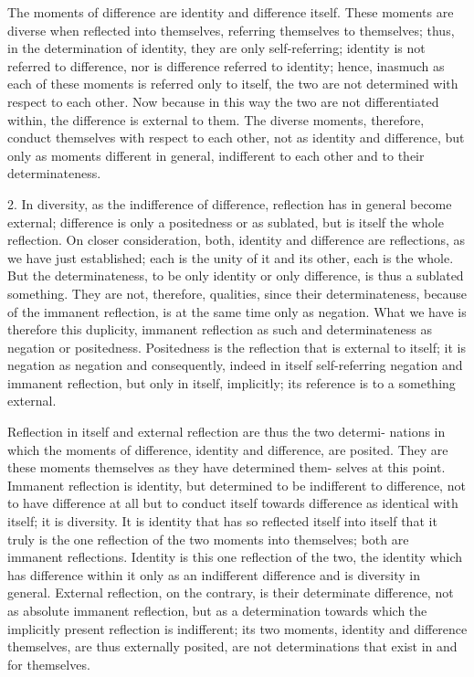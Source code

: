 The moments of difference are identity and difference itself. These
moments are diverse when reflected into themselves, referring themselves to
themselves; thus, in the determination of identity, they are only self-referring;
identity is not referred to difference, nor is difference referred to identity;
hence, inasmuch as each of these moments is referred only to itself, the two
are not determined with respect to each other.  Now because in this way
the two are not differentiated within, the difference is external to them. The
diverse moments, therefore, conduct themselves with respect to each other,
not as identity and difference, but only as moments different in general,
indifferent to each other and to their determinateness.

2. In diversity, as the indifference of difference, reflection has in general
become external; difference is only a positedness or as sublated, but is itself the
whole reflection.  On closer consideration, both, identity and difference
are reflections, as we have just established; each is the unity of it and
its other, each is the whole. But the determinateness, to be only identity
or only difference, is thus a sublated something. They are not, therefore,
qualities, since their determinateness, because of the immanent reflection,
is at the same time only as negation. What we have is therefore this
duplicity, immanent reflection as such and determinateness as negation or
positedness. Positedness is the reflection that is external to itself; it is negation
as negation and consequently, indeed in itself self-referring negation and
immanent reflection, but only in itself, implicitly; its reference is to a
something external.

Reflection in itself and external reflection are thus the two determi-
nations in which the moments of difference, identity and difference, are
posited. They are these moments themselves as they have determined them-
selves at this point.  Immanent reflection is identity, but determined to
be indifferent to difference, not to have difference at all but to conduct
itself towards difference as identical with itself; it is diversity. It is identity
that has so reflected itself into itself that it truly is the one reflection of
the two moments into themselves; both are immanent reflections. Identity
is this one reflection of the two, the identity which has difference within
it only as an indifferent difference and is diversity in general.  External
reflection, on the contrary, is their determinate difference, not as absolute
immanent reflection, but as a determination towards which the implicitly
present reflection is indifferent; its two moments, identity and difference
themselves, are thus externally posited, are not determinations that exist in
and for themselves.


